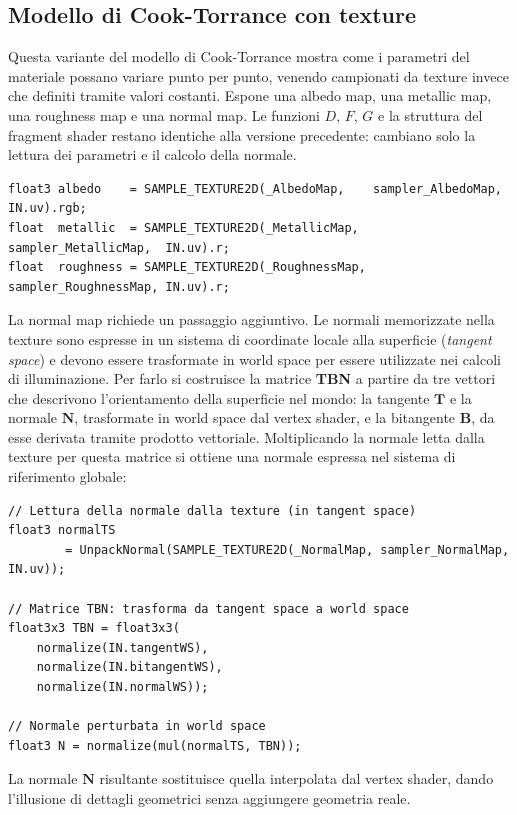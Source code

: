 \documentclass[12pt,a4paper,twoside]{book}
\begin{document}
\begin{minipage}{\textwidth}
\subsection{Modello di Cook-Torrance con texture}
\label{subsec:impl-pbr-texture}

Questa variante del modello di Cook-Torrance mostra come i parametri del materiale possano variare punto per punto, venendo campionati da texture invece che definiti tramite valori costanti. Espone una albedo map, una metallic map, una roughness map e una normal map. Le funzioni $D$, $F$, $G$ e la struttura del fragment shader restano identiche alla versione precedente: cambiano solo la lettura dei parametri e il calcolo della normale.

\begin{lstlisting}[style=hlsl,
    caption={Lettura dei parametri da texture.},
    label={lst:texture-sampling}]
float3 albedo    = SAMPLE_TEXTURE2D(_AlbedoMap,    sampler_AlbedoMap,    IN.uv).rgb;
float  metallic  = SAMPLE_TEXTURE2D(_MetallicMap,  sampler_MetallicMap,  IN.uv).r;
float  roughness = SAMPLE_TEXTURE2D(_RoughnessMap, sampler_RoughnessMap, IN.uv).r;
\end{lstlisting}

La normal map richiede un passaggio aggiuntivo. Le normali memorizzate nella texture sono espresse in un sistema di coordinate locale alla superficie (\textit{tangent space}) e devono essere trasformate in world space per essere utilizzate nei calcoli di illuminazione. Per farlo si costruisce la matrice \textbf{TBN} a partire da tre vettori che descrivono l'orientamento della superficie nel mondo: la tangente $\mathbf{T}$ e la normale $\mathbf{N}$, trasformate in world space dal vertex shader, e la bitangente $\mathbf{B}$, da esse derivata tramite prodotto vettoriale. Moltiplicando la normale letta dalla texture per questa matrice si ottiene una normale espressa nel sistema di riferimento globale:

\begin{lstlisting}[style=hlsl,
    caption={Applicazione della normal map.},
    label={lst:normal-map}]
// Lettura della normale dalla texture (in tangent space)
float3 normalTS
        = UnpackNormal(SAMPLE_TEXTURE2D(_NormalMap, sampler_NormalMap, IN.uv));

// Matrice TBN: trasforma da tangent space a world space
float3x3 TBN = float3x3(
    normalize(IN.tangentWS),
    normalize(IN.bitangentWS),
    normalize(IN.normalWS));

// Normale perturbata in world space
float3 N = normalize(mul(normalTS, TBN));
\end{lstlisting}

La normale $\mathbf{N}$ risultante sostituisce quella interpolata dal vertex shader, dando l'illusione di dettagli geometrici senza aggiungere geometria reale.

\end{minipage}
\end{document}
